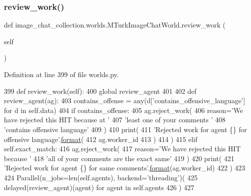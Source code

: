 \subsubsection{\texorpdfstring{review\+\_\+work()}{review\_work()}}
{\footnotesize\ttfamily def image\+\_\+chat\+\_\+collection.\+worlds.\+M\+Turk\+Image\+Chat\+World.\+review\+\_\+work (\begin{DoxyParamCaption}\item[{}]{self }\end{DoxyParamCaption})}



Definition at line 399 of file worlds.\+py.


\begin{DoxyCode}
399     \textcolor{keyword}{def }review\_work(self):
400         \textcolor{keyword}{global} review\_agent
401 
402         \textcolor{keyword}{def }review\_agent(ag):
403             contains\_offense = any(d[\textcolor{stringliteral}{'contains\_offensive\_language'}] \textcolor{keywordflow}{for} d \textcolor{keywordflow}{in} self.data)
404             \textcolor{keywordflow}{if} contains\_offense:
405                 ag.reject\_work(
406                     reason=\textcolor{stringliteral}{'We have rejected this HIT because at '}
407                     \textcolor{stringliteral}{'least one of your comments '}
408                     \textcolor{stringliteral}{'contains offensive language'}
409                 )
410                 print(
411                     \textcolor{stringliteral}{'Rejected work for agent \{\} for offensive language'}.\hyperlink{namespaceparlai_1_1chat__service_1_1services_1_1messenger_1_1shared__utils_a32e2e2022b824fbaf80c747160b52a76}{format}(
412                         ag.worker\_id
413                     )
414                 )
415             \textcolor{keywordflow}{elif} self.exact\_match:
416                 ag.reject\_work(
417                     reason=\textcolor{stringliteral}{'We have rejected this HIT because '}
418                     \textcolor{stringliteral}{'all of your comments are the exact same'}
419                 )
420                 print(
421                     \textcolor{stringliteral}{'Rejected work for agent \{\} for same comments'}.\hyperlink{namespaceparlai_1_1chat__service_1_1services_1_1messenger_1_1shared__utils_a32e2e2022b824fbaf80c747160b52a76}{format}(ag.worker\_id)
422                 )
423 
424         Parallel(n\_jobs=len(self.agents), backend=\textcolor{stringliteral}{'threading'})(
425             delayed(review\_agent)(agent) \textcolor{keywordflow}{for} agent \textcolor{keywordflow}{in} self.agents
426         )
427 
\end{DoxyCode}
\mbox{\label{classimage__chat__collection_1_1worlds_1_1MTurkImageChatWorld_ac4710715dfda617f14c962e641fd16b9}} 
